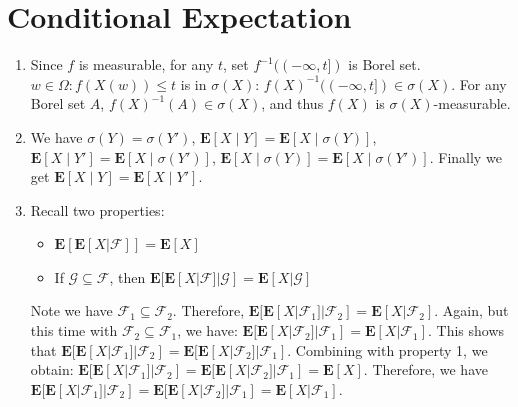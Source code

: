 \documentclass{article}
\theoremstyle{definition}
\begin{document}
	\section*{Conditional Expectation}
	\begin{enumerate}
		\item Since $f$ is measurable, for any $t$, set $f^{-1}((-\infty,t])$ is Borel set. ${w \in \Omega : f(X(w)) \leq t }$ is in $\sigma(X)$: $f(X)^{-1}((-\infty,t]) \in \sigma(X)$. For any Borel set $A$, $f(X)^{-1}(A) \in \sigma(X)$, and thus $f(X)$ is $\sigma(X)$-measurable.
		
		\item We have $\sigma(Y) = \sigma(Y')$, $\mathbf{E}[X \mid Y] = \mathbf{E}\left[X \mid \sigma(Y)\right]$, $\mathbf{E}[X \mid Y'] = \mathbf{E}\left[X \mid \sigma(Y')\right]$, $\mathbf{E}\left[X \mid \sigma(Y)\right] = \mathbf{E}\left[X \mid \sigma(Y')\right]$. Finally we get $\mathbf{E}[X \mid Y]=\mathbf{E}[X \mid Y']$.
		
		\item Recall two properties: 
		\begin{itemize}
			\item $\mathbf{E}[\mathbf{E}[X|\mathcal{F}]] = \mathbf{E}[X]$
			\item If $\mathcal{G} \subseteq \mathcal{F}$, then $\mathbf{E}[\mathbf{E}[X|\mathcal{F}]|\mathcal{G}] = \mathbf{E}[X|\mathcal{G}]$
		\end{itemize}
		
		Note we have $\mathcal{F}_1 \subseteq \mathcal{F}_2$. Therefore,
		$\mathbf{E}[\mathbf{E}[X|\mathcal{F}_1]|\mathcal{F}_2] = \mathbf{E}[X|\mathcal{F}_2]$. Again, but this time with $\mathcal{F}_2 \subseteq \mathcal{F}_1$, we have: $\mathbf{E}[\mathbf{E}[X|\mathcal{F}_2]|\mathcal{F}_1] = \mathbf{E}[X|\mathcal{F}_1]$. This shows that $\mathbf{E}[\mathbf{E}[X|\mathcal{F}_1]|\mathcal{F}_2] = \mathbf{E}[\mathbf{E}[X|\mathcal{F}_2]|\mathcal{F}_1]$. Combining with property 1, we obtain: $\mathbf{E}[\mathbf{E}[X|\mathcal{F}_1]|\mathcal{F}_2] = \mathbf{E}[\mathbf{E}[X|\mathcal{F}_2]|\mathcal{F}_1] = \mathbf{E}[X]$. Therefore, we have $\mathbf{E}[\mathbf{E}[X|\mathcal{F}_1]|\mathcal{F}_2] = \mathbf{E}[\mathbf{E}[X|\mathcal{F}_2]|\mathcal{F}_1] = \mathbf{E}[X|\mathcal{F}_1]$.
		
	\end{enumerate}
\end{document}
